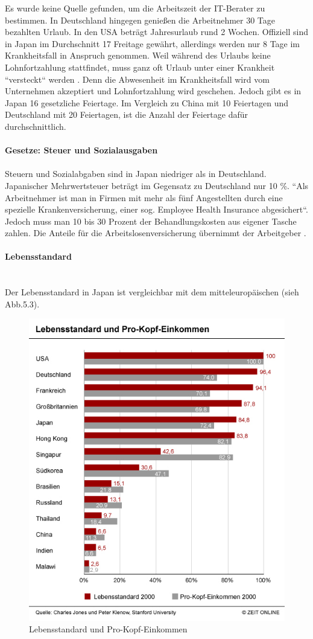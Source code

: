 	Es wurde keine Quelle gefunden, um die Arbeitszeit der IT-Berater zu bestimmen. 
	In Deutschland hingegen  genießen die Arbeitnehmer 30 Tage bezahlten Urlaub. In den USA beträgt Jahresurlaub rund 2 Wochen. Offiziell sind in Japan im Durchschnitt 17 Freitage gewährt, allerdings werden nur 8 Tage im Krankheitsfall in Anspruch genommen. Weil während des Urlaubs keine Lohnfortzahlung stattfindet, muss ganz oft Urlaub unter einer Krankheit ``versteckt`` werden \cite{JPArbeitSozKultur}. Denn die Abwesenheit im Krankheitsfall wird vom Unternehmen akzeptiert und Lohnfortzahlung wird geschehen. Jedoch gibt es in Japan 16 gesetzliche Feiertage. Im Vergleich zu China mit 10 Feiertagen und Deutschland mit 20 Feiertagen, ist die Anzahl der Feiertage dafür durchschnittlich. \\
	\\
		\textbf{Gesetze: Steuer und Sozialausgaben}\\
		\\
		Steuern und Sozialabgaben sind in Japan niedriger als in Deutschland. Japanischer Mehrwertsteuer beträgt im Gegensatz zu Deutschland nur 10 \%.
		``Als Arbeitnehmer ist man in Firmen mit mehr als fünf Angestellten durch eine spezielle Krankenversicherung, einer sog. Employee Health Insurance abgesichert``. Jedoch muss man 10 bis 30 Prozent der Behandlungskosten aus eigener Tasche zahlen. Die Anteile für die Arbeitslosenversicherung übernimmt der Arbeitgeber \cite{ArbZeitJP}. \\
	\\
			\textbf{Lebensstandard}\\
			\\
		\\Der Lebensstandard in Japan ist vergleichbar mit dem mitteleuropäischen (sieh Abb.5.3).
		\begin{figure}[ht]
		\centering
		\includegraphics[width=0.7\linewidth]{./images/Lebensstandard-Pro-Kopf-Einkommen}
		\caption{Lebensstandard und Pro-Kopf-Einkommen \cite{LebensStd}}
		\label{fig:LebStdProKEink}
		\end{figure}\\
